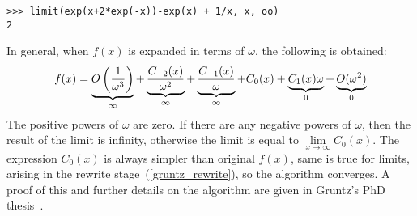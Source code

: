 \begin{verbatim}
>>> limit(exp(x+2*exp(-x))-exp(x) + 1/x, x, oo)
2
\end{verbatim}

In general, when $f(x)$ is expanded in terms of $\omega$, the following is obtained:
\begin{equation}
f(x) = \underbrace{O\left({1\over \omega^3}\right)}_\infty
    + \underbrace{C_{-2}(x)\over \omega^2}_\infty
    + \underbrace{C_{-1}(x)\over \omega}_\infty
    + {C_{0}(x)}
    + \underbrace{C_{1}(x)\omega}_0
    + \underbrace{O(\omega^2)}_0
\end{equation}
The positive powers of $\omega$ are zero. If there are any negative powers of
$\omega$, then the result of the limit is infinity, otherwise the limit is
equal to $\lim\limits_{x\to\infty} C_0(x)$. The expression $C_0(x)$ is always
simpler than original $f(x)$, same is true for limits, arising in the
rewrite stage~(\ref{gruntz_rewrite}), so the algorithm converges. A proof of this and further
details on the algorithm are given in Gruntz's PhD thesis~\cite{Gruntz1996limits}.
